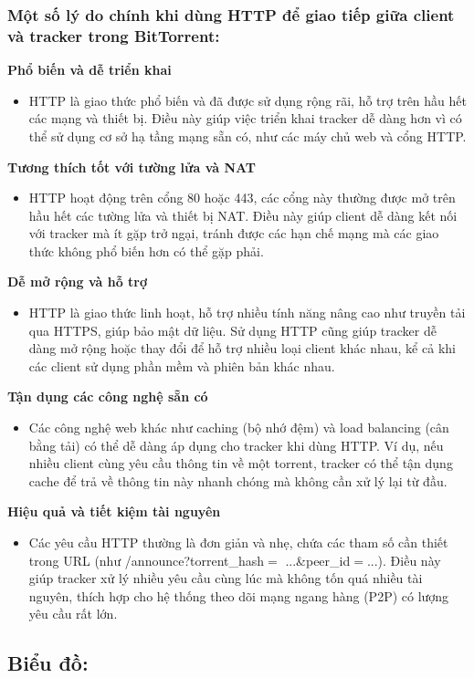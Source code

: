 \documentclass[a4paper]{article}
\begin{document}
\subsubsection{Một số lý do chính khi dùng HTTP để giao tiếp giữa client và tracker trong BitTorrent:}
\textbf{Phổ biến và dễ triển khai}
\begin{itemize}
    \item HTTP là giao thức phổ biến và đã được sử dụng rộng rãi, hỗ trợ trên hầu hết các mạng và thiết bị. Điều này giúp việc triển khai tracker dễ dàng hơn vì có thể sử dụng cơ sở hạ tầng mạng sẵn có, như các máy chủ web và cổng HTTP.
\end{itemize}

\textbf{Tương thích tốt với tường lửa và NAT}
\begin{itemize}
    \item HTTP hoạt động trên cổng 80 hoặc 443, các cổng này thường được mở trên hầu hết các tường lửa và thiết bị NAT. Điều này giúp client dễ dàng kết nối với tracker mà ít gặp trở ngại, tránh được các hạn chế mạng mà các giao thức không phổ biến hơn có thể gặp phải.
\end{itemize}

\textbf{Dễ mở rộng và hỗ trợ}
\begin{itemize}
    \item HTTP là giao thức linh hoạt, hỗ trợ nhiều tính năng nâng cao như truyền tải qua HTTPS, giúp bảo mật dữ liệu. Sử dụng HTTP cũng giúp tracker dễ dàng mở rộng hoặc thay đổi để hỗ trợ nhiều loại client khác nhau, kể cả khi các client sử dụng phần mềm và phiên bản khác nhau.
\end{itemize}

\textbf{Tận dụng các công nghệ sẵn có}
\begin{itemize}
    \item Các công nghệ web khác như caching (bộ nhớ đệm) và load balancing (cân bằng tải) có thể dễ dàng áp dụng cho tracker khi dùng HTTP. Ví dụ, nếu nhiều client cùng yêu cầu thông tin về một torrent, tracker có thể tận dụng cache để trả về thông tin này nhanh chóng mà không cần xử lý lại từ đầu.
\end{itemize}

\textbf{Hiệu quả và tiết kiệm tài nguyên}
\begin{itemize}
    \item Các yêu cầu HTTP thường là đơn giản và nhẹ, chứa các tham số cần thiết trong URL (như /announce?torrent\_hash$=$ ...\&peer\_id$=$...). Điều này giúp tracker xử lý nhiều yêu cầu cùng lúc mà không tốn quá nhiều tài nguyên, thích hợp cho hệ thống theo dõi mạng ngang hàng (P2P) có lượng yêu cầu rất lớn.
\end{itemize}

\subsection{Biểu đồ:}



 

 



 
\end{document}
